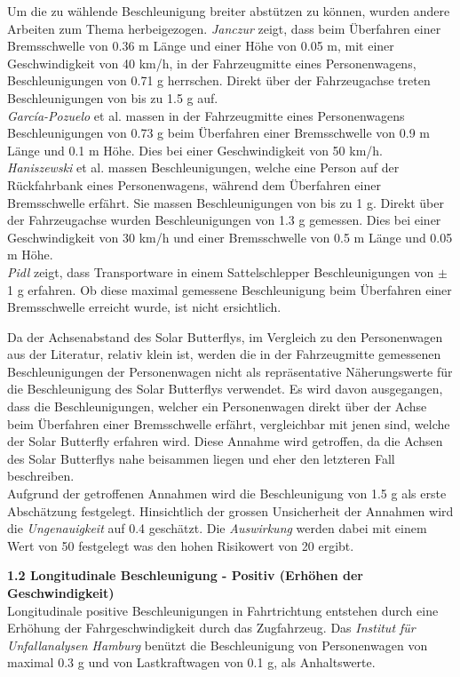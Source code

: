 \begin{description}
    Um die zu wählende Beschleunigung breiter abstützen zu können, wurden andere Arbeiten zum Thema herbeigezogen. \emph{Janczur} \cite{Beschl.1} zeigt, dass beim Überfahren einer Bremsschwelle von 0.36 m Länge und einer Höhe von 0.05 m, mit einer Geschwindigkeit von 40 km/h, in der Fahrzeugmitte eines Personenwagens, Beschleunigungen von 0.71 g herrschen. Direkt über der Fahrzeugachse treten Beschleunigungen von bis zu 1.5 g auf.\\
    \emph{García-Pozuelo} et al. \cite{Beschl.2} massen in der Fahrzeugmitte eines Personenwagens Beschleunigungen von 0.73 g beim Überfahren einer Bremsschwelle von 0.9 m Länge und 0.1 m Höhe. Dies bei einer Geschwindigkeit von 50 km/h.\\
    \emph{Haniszewski} et al. \cite{Beschl.3} massen Beschleunigungen, welche eine Person auf der Rückfahrbank eines Personenwagens, während dem Überfahren einer Bremsschwelle erfährt. Sie massen Beschleunigungen von bis zu 1 g. Direkt über der Fahrzeugachse wurden Beschleunigungen von 1.3 g gemessen. Dies bei einer Geschwindigkeit von 30 km/h und einer Bremsschwelle von 0.5 m Länge und 0.05 m Höhe.\\
    \emph{Pidl} \cite{Beschl.4} zeigt, dass Transportware in einem Sattelschlepper Beschleunigungen von $\pm$ 1 g erfahren. Ob diese maximal gemessene Beschleunigung beim Überfahren einer Bremsschwelle erreicht wurde, ist nicht ersichtlich.

    Da der Achsenabstand des Solar Butterflys, im Vergleich zu den Personenwagen aus der Literatur, relativ klein ist, werden die in der Fahrzeugmitte gemessenen Beschleunigungen der Personenwagen nicht als repräsentative Näherungswerte für die Beschleunigung des Solar Butterflys verwendet. Es wird davon ausgegangen, dass die Beschleunigungen, welcher ein Personenwagen direkt über der Achse beim Überfahren einer Bremsschwelle erfährt, vergleichbar mit jenen sind, welche der Solar Butterfly erfahren wird. Diese Annahme wird getroffen, da die Achsen des Solar Butterflys nahe beisammen liegen und eher den letzteren Fall beschreiben.\\
    Aufgrund der getroffenen Annahmen wird die Beschleunigung von 1.5 g als erste Abschätzung festgelegt. Hinsichtlich der grossen Unsicherheit der Annahmen wird die \emph{Ungenauigkeit} auf 0.4 geschätzt. Die \emph{Auswirkung} werden dabei mit einem Wert von 50 festgelegt was den hohen Risikowert von 20 ergibt.

    \item \textbf{1.2 Longitudinale Beschleunigung - Positiv (Erhöhen der Geschwindigkeit)}\\
    Longitudinale positive Beschleunigungen in Fahrtrichtung entstehen durch eine Erhöhung der Fahrgeschwindigkeit durch das Zugfahrzeug. Das \emph{Institut für Unfallanalysen Hamburg} \cite{Verz.3} benützt die Beschleunigung von Personenwagen von maximal 0.3 g und von Lastkraftwagen von 0.1 g, als Anhaltswerte.


\end{description}
